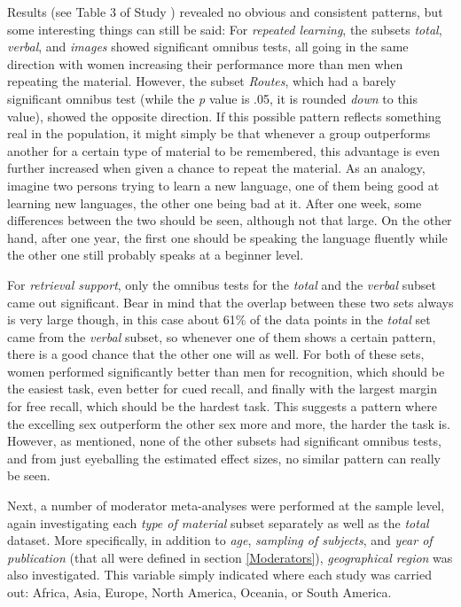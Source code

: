 Results (see Table 3 of Study ) revealed no obvious and consistent patterns, but some interesting things can still be said: For \emph{repeated learning}, the subsets \emph{total}, \emph{verbal}, and \emph{images} showed significant omnibus tests, all going in the same direction with women increasing their performance more than men when repeating the material. However, the subset \emph{Routes}, which had a barely significant omnibus test (while the \emph{p} value is .05, it is rounded \emph{down} to this value), showed the opposite direction. If this possible pattern reflects something real in the population, it might simply be that whenever a group outperforms another for a certain type of material to be remembered, this advantage is even further increased when given a chance to repeat the material. As an analogy, imagine two persons trying to learn a new language, one of them being good at learning new languages, the other one being bad at it. After one week, some differences between the two should be seen, although not that large. On the other hand, after one year, the first one should be speaking the language fluently while the other one still probably speaks at a beginner level.

For \emph{retrieval support}, only the omnibus tests for the \emph{total} and the \emph{verbal} subset came out significant. Bear in mind that the overlap between these two sets always is very large though, in this case about 61\% of the data points in the \emph{total} set came from the \emph{verbal} subset, so whenever one of them shows a certain pattern, there is a good chance that the other one will as well. For both of these sets, women performed significantly better than men for recognition, which should be the easiest task, even better for cued recall, and finally with the largest margin for free recall, which should be the hardest task. This suggests a pattern where the excelling sex outperform the other sex more and more, the harder the task is. However, as mentioned, none of the other subsets had significant omnibus tests, and from just eyeballing the estimated effect sizes, no similar pattern can really be seen.

Next, a number of moderator meta-analyses were performed at the sample level, again investigating each \emph{type of material} subset separately as well as the \emph{total} dataset. More specifically, in addition to \emph{age}, \emph{sampling of subjects}, and \emph{year of publication} (that all were defined in section \ref{Moderators}), \emph{geographical region} was also investigated. This variable simply indicated where each study was carried out: Africa, Asia, Europe, North America, Oceania, or South America.

